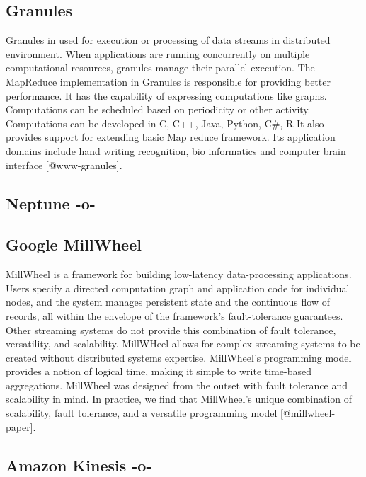 \subsection{Granules}

Granules in used for execution or processing of data streams in
distributed environment.  When applications are running concurrently
on multiple computational resources, granules manage their parallel
execution.  The MapReduce implementation in Granules is responsible
for providing better performance. It has the capability of expressing
computations like graphs.  Computations can be scheduled based on
periodicity or other activity.  Computations can be developed in C,
C++, Java, Python, C\#, R It also provides support for extending basic
Map reduce framework.  Its application domains include hand writing
recognition, bio informatics and computer brain
interface [@www-granules].

\subsection{Neptune -o-}



\subsection{Google MillWheel}

MillWheel is a framework for building low-latency data-processing
applications. Users specify a directed computation graph and
application code for individual nodes, and the system manages
persistent state and the continuous flow of records, all within the
envelope of the framework's fault-tolerance guarantees. Other
streaming systems do not provide this combination of fault tolerance,
versatility, and scalability. MillWHeel allows for complex streaming
systems to be created without distributed systems
expertise. MillWheel's programming model provides a notion of logical
time, making it simple to write time-based aggregations. MillWheel was
designed from the outset with fault tolerance and scalability in
mind. In practice, we find that MillWheel's unique combination of
scalability, fault tolerance, and a versatile programming
model [@millwheel-paper].

\subsection{Amazon Kinesis -o-}

